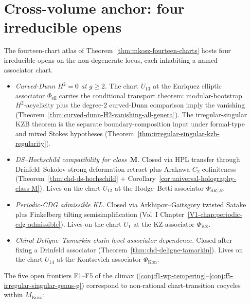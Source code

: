 \section{Cross-volume anchor: four irreducible opens}
\label{sec:mkosz-anchor}

The fourteen-chart atlas of Theorem~\ref{thm:mkosz-fourteen-charts}
hosts four irreducible opens on the non-degenerate locus, each
inhabiting a named associator chart.

\begin{itemize}
\item \emph{Curved-Dunn $H^{2}=0$ at $g\ge 2$.} The chart
 $U_{13}$ at the Enriquez elliptic associator
 $\Phi_{\mathrm{ell}}$ carries the conditional transport theorem:
 modular-bootstrap \(H^2\)-acyclicity plus the degree-\(2\)
 curved-Dunn comparison imply the vanishing
 (Theorem~\ref{thm:curved-dunn-H2-vanishing-all-genera}). The
 irregular-singular KZB theorem is the separate boundary-composition
 input under formal-type and mixed Stokes hypotheses
 (Theorem~\ref{thm:irregular-singular-kzb-regularity}).
\item \emph{DS--Hochschild compatibility for class~$\mathbf{M}$.}
 Closed via HPL transfer through Drinfeld--Sokolov strong
 deformation retract plus Arakawa $C_{2}$-cofiniteness
 (Theorem~\ref{thm:chd-ds-hochschild} +
 Corollary~\ref{cor:universal-holography-class-M}). Lives on the
 chart $U_{12}$ at the Hodge--Betti associator $\Phi_{dR,B}$.
\item \emph{Periodic-CDG admissible KL.} Closed via Arkhipov--Gaitsgory
 twisted Satake plus Finkelberg tilting semisimplification
 (Vol~I Chapter~\ref{V1-chap:periodic-cdg-admissible}). Lives on
 the chart $U_{1}$ at the KZ associator $\Phi_{\mathrm{KZ}}$.
\item \emph{Chiral Deligne--Tamarkin chain-level associator-dependence.}
 Closed after fixing a Drinfeld associator
 (Theorem~\ref{thm:chd-deligne-tamarkin}). Lives on the chart
 $U_{14}$ at the Kontsevich associator $\Phi_{\mathrm{Kon}}$.
\end{itemize}

The five open frontiers F1--F5 of the climax
(\cref{conj:f1-wp-tempering}--\cref{conj:f5-irregular-singular-genus-g})
correspond to non-rational chart-transition cocycles within
$M_{\mathrm{Kosz}}$:

